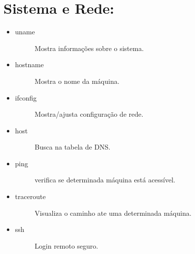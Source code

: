\documentclass[a4paper,10pt,brazil]{sphinxmanual}
\begin{document}
\section{Sistema e Rede:}
\label{unix:sistema-e-rede}\begin{itemize}
\item {} \begin{description}
\item[{uname}] \leavevmode
Mostra informações sobre o sistema.

\end{description}

\item {} \begin{description}
\item[{hostname}] \leavevmode
Mostra o nome da máquina.

\end{description}

\item {} \begin{description}
\item[{ifconfig}] \leavevmode
Mostra/ajusta configuração de rede.

\end{description}

\item {} \begin{description}
\item[{host}] \leavevmode
Busca na tabela de DNS.

\end{description}

\item {} \begin{description}
\item[{ping}] \leavevmode
verifica se determinada máquina está acessível.

\end{description}

\item {} \begin{description}
\item[{traceroute}] \leavevmode
Visualiza o caminho ate uma determinada máquina.

\end{description}

\item {} \begin{description}
\item[{ssh}] \leavevmode
Login remoto seguro.


\end{description}
\end{itemize}
\end{document}

